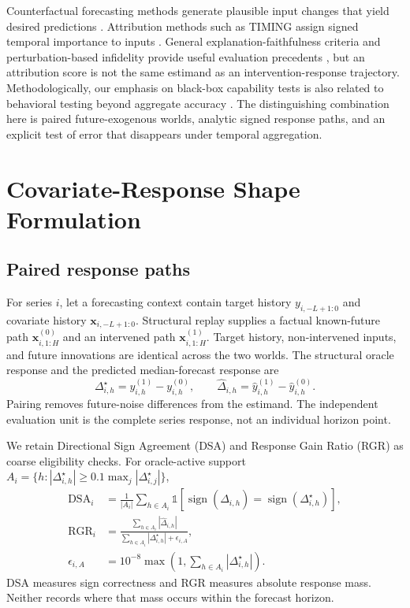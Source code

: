 \documentclass[conference]{IEEEtran}
\begin{document}
Counterfactual forecasting methods generate plausible input changes that yield desired
predictions \cite{wang2023forecastcf,kinjo2025cetx,yan2023counts}. Attribution methods
such as TIMING assign signed temporal importance to inputs
\cite{jang2025timing}. General explanation-faithfulness criteria and perturbation-based
infidelity provide useful evaluation precedents \cite{dasgupta2022faithfulness,
yeh2019infidelity}, but an attribution score is not the same estimand as an
intervention-response trajectory. Methodologically, our emphasis on black-box
capability tests is also related to behavioral testing beyond aggregate accuracy
\cite{ribeiro2020checklist}. The distinguishing combination here is paired
future-exogenous worlds, analytic signed response paths, and an explicit test of error
that disappears under temporal aggregation.

\section{Covariate-Response Shape Formulation}
\subsection{Paired response paths}

For series $i$, let a forecasting context contain target history $y_{i,-L+1:0}$ and
covariate history $\mathbf{x}_{i,-L+1:0}$. Structural replay supplies a factual
known-future path $\mathbf{x}^{(0)}_{i,1:H}$ and an intervened path
$\mathbf{x}^{(1)}_{i,1:H}$. Target history, non-intervened inputs, and future
innovations are identical across the two worlds. The structural oracle response and
the predicted median-forecast response are
\begin{equation}
\Delta^{\star}_{i,h}=y^{(1)}_{i,h}-y^{(0)}_{i,h},\qquad
\widehat{\Delta}_{i,h}=\widehat y^{(1)}_{i,h}-\widehat y^{(0)}_{i,h}.
\label{eq:responses}
\end{equation}
Pairing removes future-noise differences from the estimand. The independent evaluation
unit is the complete series response, not an individual horizon point.

We retain Directional Sign Agreement (DSA) and Response Gain Ratio (RGR) as coarse
eligibility checks. For oracle-active support
$A_i=\{h:|\Delta^\star_{i,h}|\geq0.1\max_j|\Delta^\star_{i,j}|\}$,
\begin{align}
\mathrm{DSA}_i & = \frac{1}{|A_i|}\sum_{h\in A_i}
\mathbb{1}\!\left[\operatorname{sign}(\widehat\Delta_{i,h})
=\operatorname{sign}(\Delta^\star_{i,h})\right], \\
\mathrm{RGR}_i & = \frac{\sum_{h\in A_i}|\widehat\Delta_{i,h}|}
 {\sum_{h\in A_i}|\Delta^\star_{i,h}|+\epsilon_{i,A}},\\
 \epsilon_{i,A} & =10^{-8}\max\!\left(1,
 \sum_{h\in A_i}|\Delta^\star_{i,h}|\right).
\end{align}
DSA measures sign correctness and RGR measures absolute response mass. Neither records
where that mass occurs within the forecast horizon.
\end{document}
